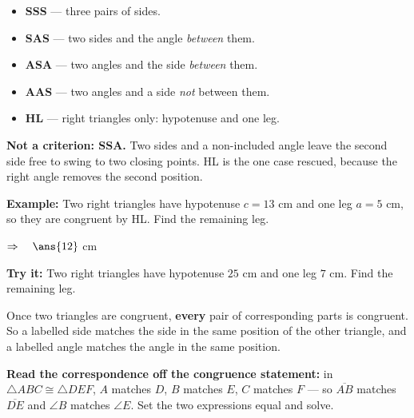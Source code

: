 \documentclass[12pt]{article}
\begin{document}


\begin{formulabox}
\begin{itemize}[leftmargin=1.1cm, itemsep=0pt, topsep=1pt]
  \item \textbf{SSS} --- three pairs of sides.
  \item \textbf{SAS} --- two sides and the angle \emph{between} them.
  \item \textbf{ASA} --- two angles and the side \emph{between} them.
  \item \textbf{AAS} --- two angles and a side \emph{not} between them.
  \item \textbf{HL} --- right triangles only: hypotenuse and one leg.
\end{itemize}
\textbf{Not a criterion: SSA.} Two sides and a non-included angle leave the second side free to swing to two closing points. HL is the one case rescued, because the right angle removes the second position.
\end{formulabox}

\begin{examplebox}
\textbf{Example:} \quad Two right triangles have hypotenuse $c = 13$ cm and one leg $a = 5$ cm, so they are congruent by HL. Find the remaining leg.

$\Rightarrow\quad \ans{12}$ cm
\end{examplebox}

\begin{tryitbox}
\textbf{Try it:} \quad Two right triangles have hypotenuse $25$ cm and one leg $7$ cm. Find the remaining leg.\\[2pt]
\end{tryitbox}


\begin{formulabox}
Once two triangles are congruent, \textbf{every} pair of corresponding parts is congruent. So a labelled side matches the side in the same position of the other triangle, and a labelled angle matches the angle in the same position.\par
\textbf{Read the correspondence off the congruence statement:} in $\triangle ABC \cong \triangle DEF$, $A$ matches $D$, $B$ matches $E$, $C$ matches $F$ --- so $\overline{AB}$ matches $\overline{DE}$ and $\angle B$ matches $\angle E$. Set the two expressions equal and solve.
\end{formulabox}
\end{document}

